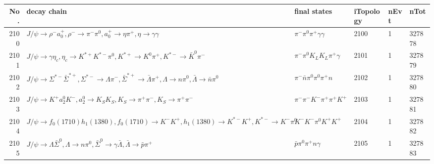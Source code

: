\begin{table}[htbp] 
\begin{center}
\begin{small}
\begin{tabular}{rlllll}\hline\hline
 No. & decay chain & final states &  iTopology & nEvt & nTot \\\hline
2100&$J/\psi       \rightarrow \rho^{-}      a_{0}^{+}      , \rho^{-}       \rightarrow \pi^{-}        \pi^{0}        , a_{0}^{+}       \rightarrow \eta          \pi^{+}        , \eta           \rightarrow \gamma       \gamma       $&$\pi^{-}        \pi^{0}        \pi^{+}        \gamma       \gamma       $& 2100&    1&327878\\
2101&$J/\psi       \rightarrow \gamma       \eta_{c}    , \eta_{c}     \rightarrow K^{*+}         K^{*-}         \pi^{0}        , K^{*+}          \rightarrow K^{0}          \pi^{+}        , K^{*-}          \rightarrow \bar{K}^{0}   \pi^{-}        $&$\pi^{-}        \pi^{0}        K_{L}          K_{L}          \pi^{+}        \gamma       $& 2101&    1&327879\\
2102&$J/\psi       \rightarrow \Sigma^{*-}       \bar{\Sigma}^{*+}, \Sigma^{*-}        \rightarrow \Lambda           \pi^{-}        , \bar{\Sigma}^{*+} \rightarrow \bar{\Lambda}    \pi^{+}        , \Lambda            \rightarrow n                 \pi^{0}        , \bar{\Lambda}     \rightarrow \bar{n}          \pi^{0}        $&$\pi^{-}        \bar{n}          \pi^{0}        \pi^{0}        \pi^{+}        n                 $& 2102&    1&327880\\
2103&$J/\psi       \rightarrow K^{+}          a_{2}^{0}      K^{-}          , a_{2}^{0}       \rightarrow K_{S}          K_{S}          , K_{S}           \rightarrow \pi^{+}        \pi^{-}        , K_{S}           \rightarrow \pi^{+}        \pi^{-}        $&$\pi^{-}        \pi^{-}        K^{-}          \pi^{+}        \pi^{+}        K^{+}          $& 2103&    1&327881\\
2104&$J/\psi       \rightarrow f_{0}(1710)    h_{1}(1380)    , f_{0}(1710)     \rightarrow K^{-}          K^{+}          , h_{1}(1380)     \rightarrow K^{*-}         K^{+}          , K^{*-}          \rightarrow K^{-}          \pi^{0}        $&$K^{-}          K^{-}          \pi^{0}        K^{+}          K^{+}          $& 2104&    1&327882\\
2105&$J/\psi       \rightarrow \Lambda           \bar{\Sigma}^0   , \Lambda            \rightarrow n                 \pi^{0}        , \bar{\Sigma}^0    \rightarrow \gamma       \bar{\Lambda}    , \bar{\Lambda}     \rightarrow \bar{p}          \pi^{+}        $&$\bar{p}          \pi^{0}        \pi^{+}        n                 \gamma       $& 2105&    1&327883\\

\end{tabular}
\end{small}
\end{center}
\end{table}
